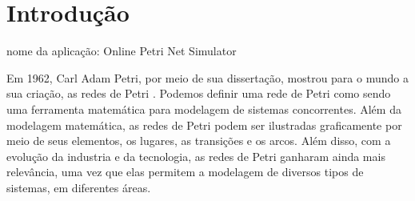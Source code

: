 \documentclass[
	12pt,				%
	openright,			%
	oneside,			%
	a4paper,			%
	english,			%
	brazil				%
	]{abntex2}
\begin{document}
\listoffigures*
\cleardoublepage





\tableofcontents*
\cleardoublepage


\makeatletter
{}
\makeatother




\textual


\chapter[Introdução]{Introdução}

nome da aplicação: Online Petri Net Simulator

Em 1962, Carl Adam Petri, por meio de sua dissertação, mostrou para o mundo a sua criação, as redes de Petri \cite{petri1962kommunikation}. Podemos definir uma rede de Petri como sendo uma ferramenta matemática para modelagem de sistemas concorrentes. Além da modelagem matemática, as redes de Petri podem ser ilustradas graficamente por meio de seus elementos, os lugares, as transições e os arcos. Além disso, com a evolução da industria e da tecnologia, as redes de Petri ganharam ainda mais relevância, uma vez que elas permitem a modelagem de diversos tipos de sistemas, em diferentes áreas. 
\end{document}
